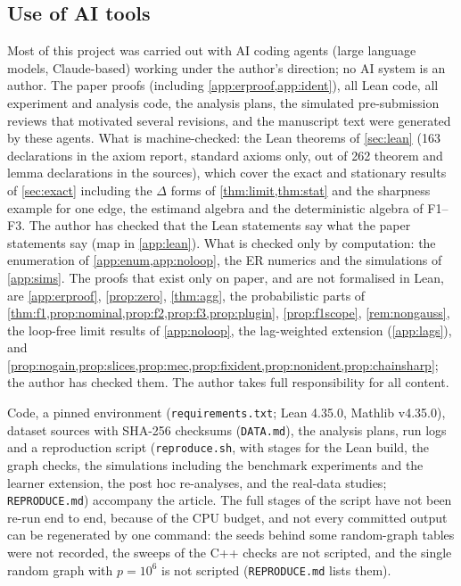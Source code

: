 \documentclass[pdflatex,sn-apa]{sn-jnl}
\theoremstyle{thmstyleone}
\theoremstyle{thmstylethree}
\theoremstyle{thmstyletwo}
\begin{document}
\subsection{Use of AI tools}
\label{sec:aiuse}

Most of this project was carried out with AI coding agents (large language
models, Claude-based) working under the author's direction; no AI system is
an author. The paper proofs (including \cref{app:erproof,app:ident}), all Lean
code, all experiment and analysis code, the analysis plans, the simulated
pre-submission reviews that motivated several revisions, and the manuscript
text were generated by these agents. What is machine-checked: the Lean theorems
of \cref{sec:lean} (163 declarations in the axiom report, standard axioms only,
out of 262 theorem and lemma declarations in the sources), which cover the
exact and stationary results of \cref{sec:exact} including the $\Delta$ forms
of \cref{thm:limit,thm:stat} and the sharpness example for one edge, the
estimand algebra and the deterministic algebra of F1--F3. The author has
checked that the Lean statements say what the paper statements say (map in
\cref{app:lean}). What is checked only by
computation: the enumeration of \cref{app:enum,app:noloop}, the ER numerics
and the simulations of \cref{app:sims}. The proofs that exist only on paper, and are
not formalised in Lean, are \cref{app:erproof}, \cref{prop:zero},
\cref{thm:agg}, the probabilistic parts of
\cref{thm:f1,prop:nominal,prop:f2,prop:f3,prop:plugin}, \cref{prop:f1scope},
\cref{rem:nongauss}, the loop-free limit results of \cref{app:noloop}, the
lag-weighted extension (\cref{app:lags}), and
\cref{prop:nogain,prop:slices,prop:mec,prop:fixident,prop:nonident,prop:chainsharp}; the author
has checked them. The author takes full responsibility for all content.

\backmatter

Code, a pinned environment (\texttt{requirements.txt}; Lean 4.35.0, Mathlib
v4.35.0), dataset sources with SHA-256 checksums (\texttt{DATA.md}), the
analysis plans, run logs and a reproduction script (\texttt{reproduce.sh},
with stages for the Lean build, the graph checks, the simulations including
the benchmark experiments and the learner extension, the post hoc
re-analyses, and the real-data studies; \texttt{REPRODUCE.md}) accompany the
article. The full stages of the script have not been re-run end to end, because
of the CPU budget, and not every committed output can be regenerated by one
command: the seeds behind some random-graph tables were not recorded, the
sweeps of the C++ checks are not scripted, and the single random graph with
$p=10^6$ is not scripted (\texttt{REPRODUCE.md} lists them).
\end{document}

